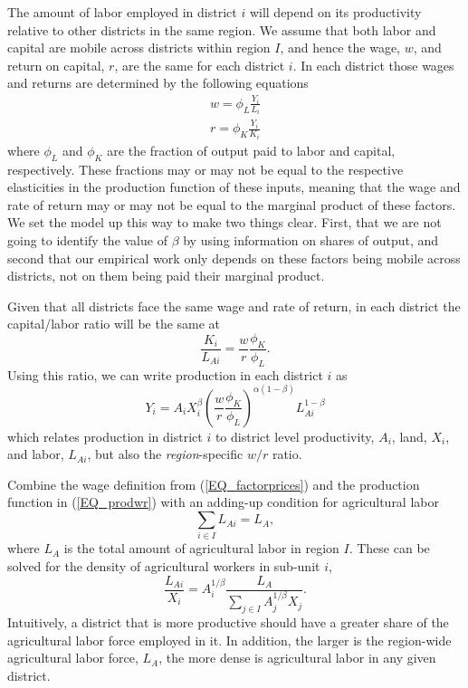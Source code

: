\documentclass[11pt]{article}
\begin{document}
The amount of labor employed in district $i$ will depend on its productivity relative to other districts in the same region. We assume that both labor and capital are mobile across districts within region $I$, and hence the wage, $w$, and return on capital, $r$, are the same for each district $i$. In each district those wages and returns are determined by the following equations
\begin{eqnarray}
    w = \phi_L \frac{Y_i}{L_i} \\ \nonumber
    r = \phi_K \frac{Y_i}{K_i} \label{EQ_factorprices}
\end{eqnarray}
where $\phi_L$ and $\phi_K$ are the fraction of output paid to labor and capital, respectively. These fractions may or may not be equal to the respective elasticities in the production function of these inputs, meaning that the wage and rate of return may or may not be equal to the marginal product of these factors. We set the model up this way to make two things clear. First, that we are not going to identify the value of $\beta$ by using information on shares of output, and second that our empirical work only depends on these factors being mobile across districts, not on them being paid their marginal product.

Given that all districts face the same wage and rate of return, in each district the capital/labor ratio will be the same at
\begin{equation}
    \frac{K_i}{L_{Ai}} = \frac{w}{r}\frac{\phi_K}{\phi_L}. \nonumber
\end{equation}
Using this ratio, we can write production in each district $i$ as
\begin{equation}
Y_{i} = A_{i} X_{i}^{\beta} \left(\frac{w}{r}\frac{\phi_K}{\phi_L}\right)^{\alpha(1-\beta)} L_{Ai}^{1-\beta} \label{EQ_prodwr}
\end{equation}
which relates production in district $i$ to district level productivity, $A_i$, land, $X_i$, and labor, $L_{Ai}$, but also the \textit{region}-specific $w/r$ ratio.

Combine the wage definition from (\ref{EQ_factorprices}) and the production function in (\ref{EQ_prodwr}) with an adding-up condition for agricultural labor 
\begin{equation}
\sum_{i\in I} L_{Ai} = L_A, \nonumber
\end{equation}
where $L_A$ is the total amount of agricultural labor in region $I$. These can be solved for the density of agricultural workers in sub-unit $i$,
\begin{equation}
\frac{L_{Ai}}{X_i} = A_{i}^{1/\beta}\frac{L_A}{\sum_{j\in I} A_{j}^{1/\beta}X_{j}}. \label{EQ_LaX}
\end{equation}
Intuitively, a district that is more productive should have a greater share of the agricultural labor force employed in it. In addition, the larger is the region-wide agricultural labor force, $L_A$, the more dense is agricultural labor in any given district.
\end{document}

